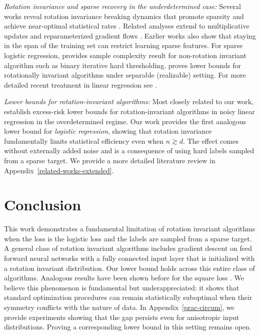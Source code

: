 \documentclass{article}
\theoremstyle{plain}
\theoremstyle{definition}
\theoremstyle{remark}
\begin{document}
\textit{Rotation invariance and sparse recovery in the underdetermined case:}
Several works reveal rotation invariance breaking dynamics that promote sparsity and achieve near-optimal statistical rates
\cite{pesme2023saddle, vaskevicius2019implicit, woodworth2020kernel, amid2020reparameterizing}.
Related analyses extend to multiplicative updates and reparameterized gradient flows
\citep{warmuth2021case, amid2022step}. Earlier works \cite{warmuth2005leaving} also show that staying in the span of the training set can restrict learning sparse features.
For sparse logistic regression, \citet{matsumoto2025learning} provides sample complexity result for non-rotation invariant algorithm such as binary iterative hard thresholding. \citet{ng2004feature} proves lower bounds for rotationally invariant algorithms under separable (realizable) setting. For more detailed recent treatment in linear regression see \cite{warmuth2021case}.

\textit{Lower bounds for rotation-invariant algorithms:}
Most closely related to our work, \citet{pmlr-v272-warmuth25a} establish excess-risk lower bounds for
rotation-invariant algorithms in noisy linear regression in the overdetermined regime.
Our work provides the first analogous lower bound for \emph{logistic regression},
showing that rotation invariance fundamentally limits
statistical efficiency even when $n \gtrsim d$.  The effect
comes without externally added noise and is a consequence
of using hard labels sampled from a sparse target. We
provide a more detailed literature review in Appendix~\ref{related-works-extended}. 

\section{Conclusion}
This work demonstrates a fundamental limitation of rotation invariant algorithms 
when the loss is the logistic loss and the labels are sampled from a sparse target.
A general class of rotation invariant algorithms includes
gradient descent on feed forward neural networks with a fully connected input layer
that is initialized with a rotation invariant distribution. 
Our lower bound holds across this entire class of algorithms.
Analogous results have been shown before for the square loss \cite{pmlr-v272-warmuth25a}.
We believe this phenomenon is fundamental but
underappreciated: it shows that standard optimization procedures can remain
statistically suboptimal when their symmetry conflicts with the nature of data. In Appendix~\ref{prac-circum}, we provide experiments showing that the gap persists even for anisotropic input distributions. Proving a corresponding lower bound in this setting remains open.
\end{document}
